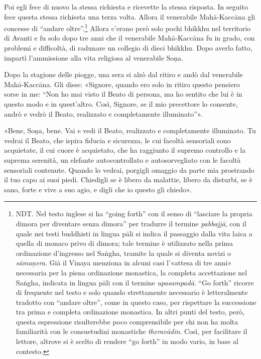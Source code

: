 Poi egli fece di nuovo la stessa richiesta e ricevette la stessa
risposta. In seguito fece questa stessa richiesta una terza volta.
Allora il venerabile Mahā-Kaccāna gli concesse di “andare
oltre”.\footnote{NDT. Nel testo inglese si ha “going forth” con il senso di “lasciare la propria dimora per diventare senza dimora” per tradurre il termine \emph{pabbajjā}, con il quale nei testi buddhisti in lingua pāli si indica il passaggio dalla vita laica a quella di monaco privo di dimora; tale termine è utilizzato nella prima ordinazione d’ingresso nel Saṅgha, tramite la quale si diventa novizi o \emph{sāmaṇera}. Già il Vinaya menziona in alcuni casi l’«attesa di tre anni» necessaria per la piena ordinazione monastica, la completa accettazione nel Saṅgha, indicata in lingua pāli con il termine \emph{upasampadā}. “Go forth” ricorre di frequente nel testo e solo quando strettamente necessario è letteralmente tradotto con “andare oltre”, come in questo caso, per rispettare la successione tra prima e completa ordinazione monastica. In altri punti del testo, però, questa espressione risulterebbe poco comprensibile per chi non ha molta familiarità con le consuetudini monastiche \emph{theravādin}. Così, per facilitare il lettore, altrove si è scelto di rendere “go forth” in modo vario, in base al contesto.} Allora c’erano però solo pochi bhikkhu nel
territorio di Avanti e fu solo dopo tre anni che il venerabile
Mahā-Kaccāna fu in grado, con problemi e difficoltà, di radunare un
collegio di dieci bhikkhu. Dopo averlo fatto, impartì l’ammissione alla
vita religiosa al venerabile Soṇa.


Dopo la stagione delle piogge, una sera si alzò dal ritiro e andò dal
venerabile Mahā-Kaccāna. Gli disse: «Signore, quando ero solo in ritiro
questo pensiero sorse in me: “Non ho mai visto il Beato di persona, ma
ho sentito che lui è in questo modo e in quest’altro. Così, Signore, se
il mio precettore lo consente, andrò e vedrò il Beato, realizzato e
completamente illuminato”».


«Bene, Soṇa, bene. Vai e vedi il Beato, realizzato e completamente
illuminato. Tu vedrai il Beato, che ispira fiducia e sicurezza, le cui
facoltà sensoriali sono acquietate, il cui cuore è acquietato, che ha
raggiunto il supremo controllo e la suprema serenità, un elefante
autocontrollato e autosorvegliato con le facoltà sensoriali contenute.
Quando lo vedrai, porgigli omaggio da parte mia prostrando il tuo capo
ai suoi piedi. Chiedigli se è libero da malattie, libero da disturbi, se
è sano, forte e vive a suo agio, e digli che io questo gli chiedo».


